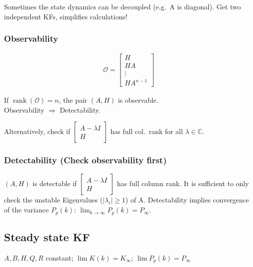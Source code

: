 \documentclass[landscape,a4paper,8pt]{scrartcl}
\DeclareMathOperator\rank{rank}
\begin{document}
\begin{multicols*}{3}
Sometimes the state dynamics can be decoupled (e.g.\ A is diagonal).
Get two independent KFs, simplifies calculations!

\subsubsection{Observability}

\begin{minipage}[c]{0.4\columnwidth}
\begin{align*}
 \mathcal{O} = \begin{bmatrix}
 H \\ H A \\ \vdots \\ H A ^{n-1}
 \end{bmatrix} 
\end{align*}
\end{minipage}
\begin{minipage}[c]{0.6\columnwidth}
If $\rank(\mathcal{O})=n$, the pair $(A,H)$ is observable. \\

Observability $\Rightarrow$ Detectability. 
\end{minipage}
Alternatively, check if $\begin{bmatrix} A-\lambda I \\ H \end{bmatrix}$ has full col.\ rank for all $\lambda \in \mathbb{C}$.

\subsubsection{Detectability (Check observability first)}
$(A,H)$ is detectable if $\begin{bmatrix}
A-\lambda I \\ H
\end{bmatrix}$ has full column rank. It is sufficient to only check the unstable Eigenvalues ($|\lambda_i| \geq 1$) of A. Detectability implies convergence of the variance $P_p(k)$:  $\lim_{k \to \infty} P_p(k) = P_{\infty}$.

\clearpage
\vspace*{1em}
\clearpage

\subsection{Steady state KF}
$A, B, H, Q, R$ constant; \quad $\lim K(k) = K_{\infty}$; \quad $\lim P_p(k) = P_\infty$ \\


\end{multicols*}
\end{document}
